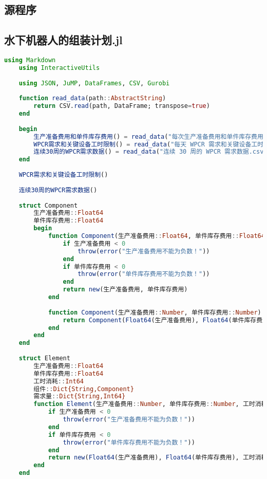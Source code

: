 \begin{appendices}

\section{源程序}


\subsection{水下机器人的组装计划.jl} %
\begin{lstlisting}[language=julia]
    using Markdown
    using InteractiveUtils
    
    using JSON, JuMP, DataFrames, CSV, Gurobi
    
    function read_data(path::AbstractString)
        return CSV.read(path, DataFrame; transpose=true)
    end
    
    begin
        生产准备费用和单件库存费用() = read_data("每次生产准备费用和单件库存费用.csv")
        WPCR需求和关键设备工时限制() = read_data("每天 WPCR 需求和关键设备工时限制.csv")
        连续30周的WPCR需求数据() = read_data("连续 30 周的 WPCR 需求数据.csv")
    end
    
    WPCR需求和关键设备工时限制()
    
    连续30周的WPCR需求数据()
    
    struct Component
        生产准备费用::Float64
        单件库存费用::Float64
        begin
            function Component(生产准备费用::Float64, 单件库存费用::Float64)
                if 生产准备费用 < 0
                    throw(error("生产准备费用不能为负数！"))
                end
                if 单件库存费用 < 0
                    throw(error("单件库存费用不能为负数！"))
                end
                return new(生产准备费用, 单件库存费用)
            end
    
            function Component(生产准备费用::Number, 单件库存费用::Number)
                return Component(Float64(生产准备费用), Float64(单件库存费用))
            end
        end
    end
    
    struct Element
        生产准备费用::Float64
        单件库存费用::Float64
        工时消耗::Int64
        组件::Dict{String,Component}
        需求量::Dict{String,Int64}
        function Element(生产准备费用::Number, 单件库存费用::Number, 工时消耗::Int64, 组件::Dict{String,Component}, 需求量::Dict{String,Int64})
            if 生产准备费用 < 0
                throw(error("生产准备费用不能为负数！"))
            end
            if 单件库存费用 < 0
                throw(error("单件库存费用不能为负数！"))
            end
            return new(Float64(生产准备费用), Float64(单件库存费用), 工时消耗, 组件, 需求量)
        end
    end
    

\end{lstlisting}
\end{appendices}
